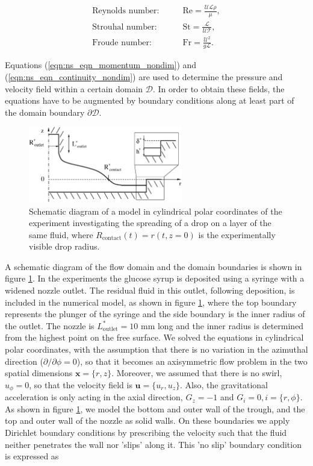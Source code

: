 \documentclass[aip,graphicx]{revtex4-1}
\newcommand{\sym}[1]{\text{#1}}
\newcommand{\vect}[1]{\bm{#1}}
\begin{document}
\begin{align*}
 \text{Reynolds number:} \qquad &\sym{Re}=\frac{\mathcal{UL} \rho}{\mu}, \\
 \text{Strouhal number:} \qquad &\sym{St}=\frac{\mathcal{L}}{\mathcal{UT}}, \\
 \text{Froude number:} \qquad &\sym{Fr}=\frac{\mathcal{U}^2}{g \mathcal{L}}.
\end{align*}

Equations (\ref{eqn:ns_eqn_momentum_nondim}) and (\ref{eqn:ns_eqn_continuity_nondim}) are used to determine the pressure and velocity field within a certain domain $\mathcal{D}$. 
In order to obtain these fields, the equations have to be augmented by boundary conditions along at least part of the domain boundary $\partial \mathcal{D}$.

\begin{figure}[!ht]
\centering
\includegraphics[width=0.6\textwidth]{figures/axisym_drop_nozzle_gap_computation.eps}
\caption{Schematic diagram of a model in cylindrical polar coordinates of the experiment investigating the spreading of a drop on a layer of the same fluid, where $R_{\sym{contact}}(t)=r(t,z=0)$ is the experimentally visible drop radius.}
\label{fig:axisym_drop_nozzle}
\end{figure}

A schematic diagram of the flow domain and the domain boundaries is shown in figure \ref{fig:axisym_drop_nozzle}.
In the experiments the glucose syrup is deposited using a syringe with a widened nozzle outlet.
The residual fluid in this outlet, following deposition, is included in the numerical model, as shown in figure \ref{fig:axisym_drop_nozzle}, where the top boundary represents the plunger of the syringe and the side boundary is the inner radius of the outlet.
The nozzle is $L^*_{\sym{outlet}}=10$ mm long and the inner radius is determined from the highest point on the free surface.
We solved the equations in cylindrical polar coordinates, with the assumption that there is no variation in the azimuthal direction ($\partial / \partial \phi = 0$), so that it becomes an axisymmetric flow problem in the two spatial dimensions $\vect{x}=\{r,z\}$. 
Moreover, we assumed that there is no swirl, $u_{\phi}=0$, so that the velocity field is $\vect{u}=\{u_r,u_z\}$.
Also, the gravitational acceleration is only acting in the axial direction, $G_z = -1$ and $G_i=0, i = \{ r,\phi \}$.
As shown in figure \ref{fig:axisym_drop_nozzle}, we model the bottom and outer wall of the trough, and the top and outer wall of the nozzle as solid walls.
On these boundaries we apply Dirichlet boundary conditions by prescribing the velocity such that the fluid neither penetrates the wall nor 'slips' along it. 
This 'no slip' boundary condition is expressed as
\end{document}
